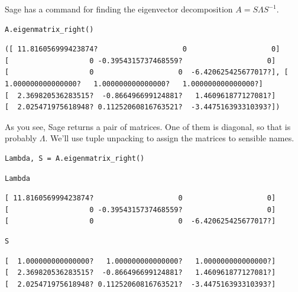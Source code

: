 \documentclass[10pt,]{book}
\theoremstyle{plain}
\theoremstyle{definition}
\numberwithin{equation}{section}
\begin{document}
      Sage has a command for finding the eigenvector decomposition
      \(A = S\Lambda S^{-1}\).
\begin{lstlisting}[style=sageinput]
A.eigenmatrix_right()
\end{lstlisting}
\begin{lstlisting}[style=sageoutput]
([ 11.816056999423874?                    0                    0]
[                   0 -0.3954315737468559?                    0]
[                   0                    0  -6.420625425677017?], [  1.000000000000000?   1.000000000000000?   1.000000000000000?]
[  2.369820536283515?  -0.866496699124881?   1.460961877127081?]
[  2.025471975618948? 0.11252060816763521?  -3.447516393310393?])
\end{lstlisting}
\par

      As you see, Sage returns a pair of matrices. One of them is diagonal, so that
      is probably \(\Lambda\). We'll use tuple unpacking to assign the matrices to
      sensible names.
\begin{lstlisting}[style=sageinput]
Lambda, S = A.eigenmatrix_right()
\end{lstlisting}
\begin{lstlisting}[style=sageinput]
Lambda
\end{lstlisting}
\begin{lstlisting}[style=sageoutput]
[ 11.816056999423874?                    0                    0]
[                   0 -0.3954315737468559?                    0]
[                   0                    0  -6.420625425677017?]
\end{lstlisting}
\begin{lstlisting}[style=sageinput]
S
\end{lstlisting}
\begin{lstlisting}[style=sageoutput]
[  1.000000000000000?   1.000000000000000?   1.000000000000000?]
[  2.369820536283515?  -0.866496699124881?   1.460961877127081?]
[  2.025471975618948? 0.11252060816763521?  -3.447516393310393?]
\end{lstlisting}
\par
\end{document}
